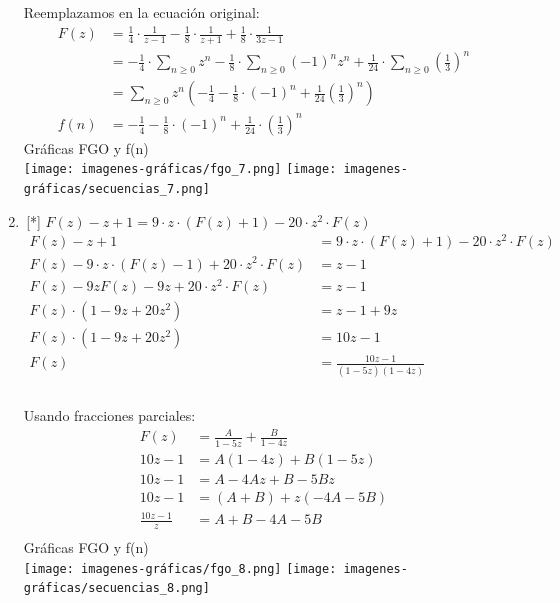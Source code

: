 \begin{enumerate}
    Reemplazamos en la ecuación original:\\
    \begin{align*}
        F(z) &= \frac{1}{4} \cdot \frac{1}{z-1} -\frac{1}{8} \cdot \frac{1}{z+1} + \frac{1}{8} \cdot \frac{1}{3z-1}\\
        &= -\frac{1}{4} \cdot\sum_{n\geq0} z^n -\frac{1}{8} \cdot\sum_{n\geq0} (-1)^n z^n + \frac{1}{24} \cdot\sum_{n\geq0} \left(\frac{1}{3}\right)^n\\
        &= \sum_{n\geq0} z^n \left(-\frac{1}{4}-\frac{1}{8} \cdot(-1)^n +\frac{1}{24} \left(\frac{1}{3}\right)^n\right)\\
        f(n) &= -\frac{1}{4} -\frac{1}{8} \cdot(-1)^n +\frac{1}{24} \cdot\left(\frac{1}{3}\right)^n
    \end{align*}
    Gráficas FGO y f(n)\\
    \texttt{[image: imagenes-gráficas/fgo\_7.png]}
    \texttt{[image: imagenes-gráficas/secuencias\_7.png]}

    \item \,[*] $F(z) - z + 1 = 9\cdot z\cdot (F(z)+1)-20\cdot z^2\cdot F(z)$\\
    \begin{align*}
        F(z) - z + 1 &= 9\cdot z\cdot (F(z)+1)-20\cdot z^2\cdot F(z)\\
        F(z) - 9\cdot z\cdot (F(z)-1) + 20\cdot z^2 \cdot F(z) &= z-1\\
        F(z) -9zF(z) - 9z + 20\cdot z^2 \cdot F(z) &= z-1\\
        F(z)\cdot (1 - 9z +20z^2) &= z-1+9z\\ 
        F(z)\cdot (1 - 9z +20z^2) &= 10z -1\\
        F(z) &= \frac{10z-1}{(1-5z)(1-4z)}\\
    \end{align*}\\
    Usando fracciones parciales:\\
    \begin{align*}
        F(z) &= \frac{A}{1-5z} +\frac{B}{1-4z}\\
        10z-1 &= A(1-4z) + B(1-5z)\\
        10z-1 &= A - 4Az + B - 5Bz\\
        10z-1 &= (A+B) + z(-4A - 5B)\\
        \frac{10z-1}{z} &= A + B -4A -5B\\
    \end{align*}
    Gráficas FGO y f(n)\\
    \texttt{[image: imagenes-gráficas/fgo\_8.png]}
    \texttt{[image: imagenes-gráficas/secuencias\_8.png]}
\end{enumerate}
%

